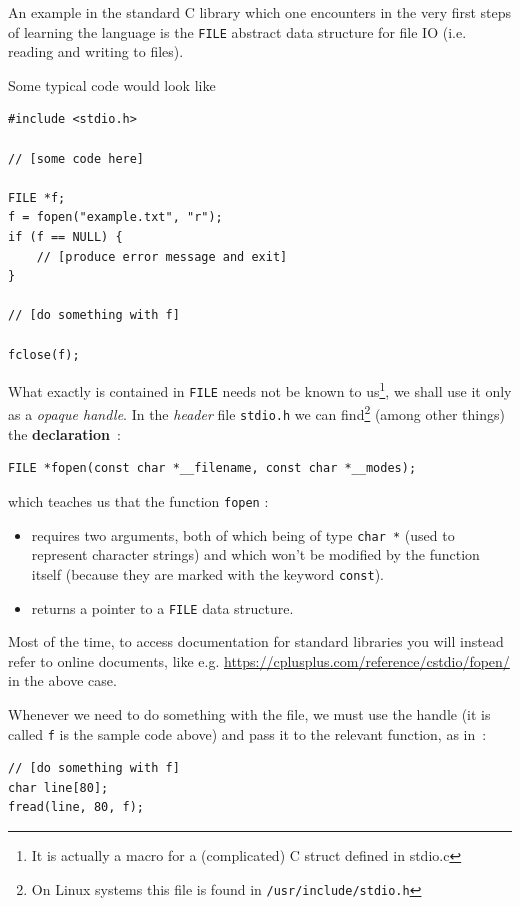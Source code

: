 \documentclass[12pt]{article}
\theoremstyle{plain}
\theoremstyle{remark}
\begin{document}
\medskip

An example in the standard C library which one encounters in the very first
steps of learning the language is the {\tt FILE} abstract data structure
for file IO (i.e. reading and writing to files).

Some typical code would look like

\begin{lstlisting}[style=C]
#include <stdio.h>

// [some code here]

FILE *f;  
f = fopen("example.txt", "r");
if (f == NULL) {
	// [produce error message and exit]
}

// [do something with f]

fclose(f);
\end{lstlisting}

What exactly is contained in {\tt FILE} needs not be known to us\footnote{It is actually
a macro for a (complicated) C struct defined in stdio.c}, we shall use it only as
a {\it opaque handle}. In the {\it header} file {\tt stdio.h} we can
find\footnote{On Linux systems this file is found in {\tt /usr/include/stdio.h}} 
(among other things) the {\bf declaration}~:
\begin{lstlisting}[style=C]
FILE *fopen(const char *__filename, const char *__modes);
\end{lstlisting}
which teaches us that the function {\tt fopen} :
\begin{itemize}
	\item requires two arguments, both of which being of type 
		{\tt char *} (used to represent character strings) and 
		which won't be modified by the function itself (because they 
		are marked with the keyword {\tt const}).
	\item returns a pointer to a {\tt FILE} data structure.
\end{itemize}
Most of the time, to access documentation for standard libraries you will
instead refer to online documents, like e.g. 
\url{https://cplusplus.com/reference/cstdio/fopen/} in the above case.

\medskip

Whenever we need to do something with the file, we must use the handle (it is
called {\tt f} is the sample code above) and pass it to the relevant function,
as in~:
\begin{lstlisting}[style=C]
// [do something with f]
char line[80];
fread(line, 80, f);
\end{lstlisting}
\end{document}
